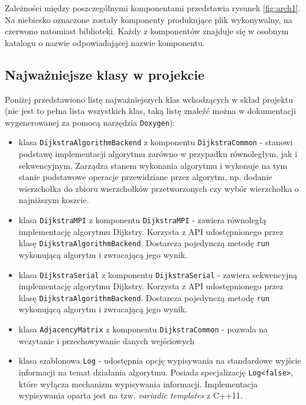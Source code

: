 \documentclass[12pt]{article}
\begin{document}
Zależności między poszczególnymi komponentami przedstawia rysunek \ref{fig:arch1}. Na niebiesko oznaczone zostały komponenty produkujące plik wykonywalny, na czerwono natomiast biblioteki. Każdy z komponentów znajduje się w osobnym katalogu o nazwie odpowiadającej nazwie komponentu.


\subsection{Najważniejsze klasy w projekcie}
Poniżej przedstawiono listę najważniejszych klas wchodzących w skład projektu (nie jest to pełna lista wszystkich klas, taką listę znaleźć można w dokumentacji wygenerowanej za pomocą narzędzia \lstinline{Doxygen}):
\begin{itemize}
\item klasa \lstinline{DijkstraAlgorithmBackend} z komponentu \lstinline{DijkstraCommon} - stanowi podstawę implementacji algorytmu zarówno w przypadku równoległym, jak i sekwencyjnym. Zarządza stanem wykonania algorytmu i wykonuje na tym stanie podstawowe operacje przewidziane przez algorytm, np. dodanie wierzchołka do zbioru wierzchołków przetworzonych czy wybór wierzchołka o najniższym koszcie. 
\item klasa \lstinline{DijkstraMPI} z komponentu \lstinline{DijkstraMPI} - zawiera równoległą implementację algorytmu Dijkstry. Korzysta z API udostępnionego przez klasę \lstinline{DijkstraAlgorithmBackend}. Dostarcza pojedynczą metodę \lstinline{run} wykonującą algorytm i zwracającą jego wynik.
\item klasa \lstinline{DijkstraSerial} z komponentu \lstinline{DijkstraSerial} - zawiera sekwencyjną implementację algorytmu Dijkstry. Korzysta z API udostępnionego przez klasę \lstinline{DijkstraAlgorithmBackend}. Dostarcza pojedynczą metodę \lstinline{run} wykonującą algorytm i zwracającą jego wynik.
\item klasa \lstinline{AdjacencyMatrix} z komponentu \lstinline{DijkstraCommon} - pozwala na wczytanie i przechowywanie danych wejściowych
\item klasa szablonowa \lstinline{Log} - udostępnia opcję wypisywania na standardowe wyjście informacji na temat działania algorytmu. Posiada specjalizację \lstinline{Log<false>}, które wyłącza mechanizm wypisywania informacji. Implementacja wypisywania oparta jest na tzw. \textit{variadic templates} z C++11. 
\end{itemize}

\newpage
\end{document}
